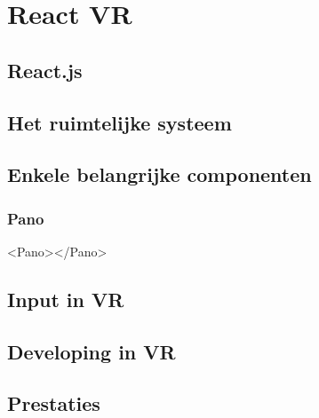 \chapter{React VR}
\label{ch:react-vr}
\section{React.js}

\section{Het ruimtelijke systeem}

\section{Enkele belangrijke componenten}
\subsection{Pano}
<Pano></Pano>

\section{Input in VR}

\section{Developing in VR}

\section{Prestaties}
